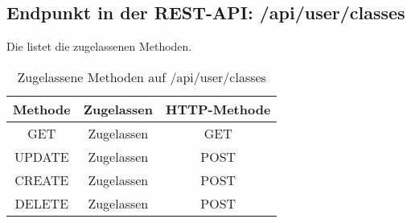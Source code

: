 \subsection{Endpunkt in der REST-API: /api/user/classes}
Die  listet die zugelassenen Methoden. 

\begin{table}[!htbp]
	\begin{tabular}{|c|c|c|}
		\hline
			\textbf{Methode} & \textbf{Zugelassen} & \textbf{HTTP-Methode} \\ \hline
			GET & Zugelassen &  GET \\ \hline
			UPDATE & Zugelassen & POST \\ \hline 
			CREATE & Zugelassen & POST \\ \hline 
			DELETE & Zugelassen & POST \\ \hline
	\end{tabular}

		\caption{Zugelassene Methoden auf /api/user/classes}
		\label{tab:end:rest:api:user:classes:meth}
\end{table}